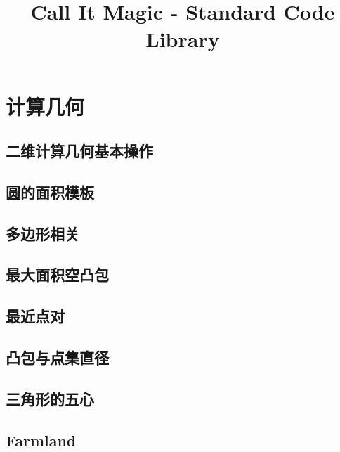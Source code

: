 \documentclass[10pt]{article}
\begin{document}
\title{Call It Magic - Standard Code Library}
\date{}
\tableofcontents
\newpage

\section{计算几何}

	\subsection{二维计算几何基本操作}
		
		
	\subsection{圆的面积模板}
		

	\subsection{多边形相关}
		

	\subsection{最大面积空凸包}
		

	\subsection{最近点对}
		

	\subsection{凸包与点集直径}
		

	\subsection{三角形的五心}
		

	\subsection{Farmland}
		
\end{document}
